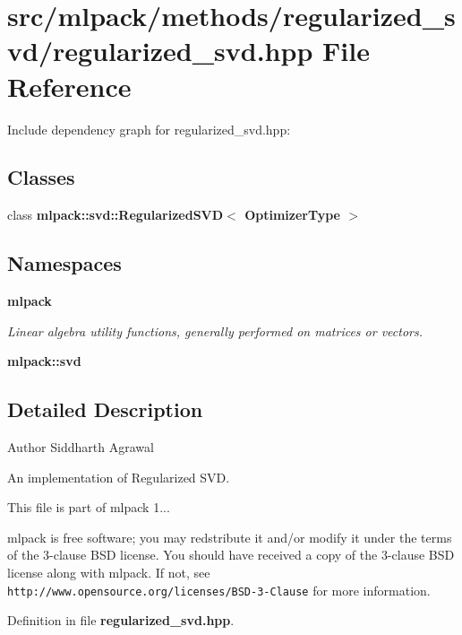 \section{src/mlpack/methods/regularized\-\_\-svd/regularized\-\_\-svd.hpp File Reference}
\label{regularized__svd_8hpp}
Include dependency graph for regularized\-\_\-svd.\-hpp\-:
\subsection*{Classes}
\begin{DoxyCompactItemize}
\item 
class {\bf mlpack\-::svd\-::\-Regularized\-S\-V\-D$<$ Optimizer\-Type $>$}
\end{DoxyCompactItemize}
\subsection*{Namespaces}
\begin{DoxyCompactItemize}
\item 
{\bf mlpack}
\begin{DoxyCompactList}\small\item\em Linear algebra utility functions, generally performed on matrices or vectors. \end{DoxyCompactList}\item 
{\bf mlpack\-::svd}
\end{DoxyCompactItemize}


\subsection{Detailed Description}
\begin{DoxyAuthor}{Author}
Siddharth Agrawal
\end{DoxyAuthor}
An implementation of Regularized S\-V\-D.

This file is part of mlpack 1...

mlpack is free software; you may redstribute it and/or modify it under the terms of the 3-\/clause B\-S\-D license. You should have received a copy of the 3-\/clause B\-S\-D license along with mlpack. If not, see {\tt http\-://www.\-opensource.\-org/licenses/\-B\-S\-D-\/3-\/\-Clause} for more information. 

Definition in file {\bf regularized\-\_\-svd.\-hpp}.

